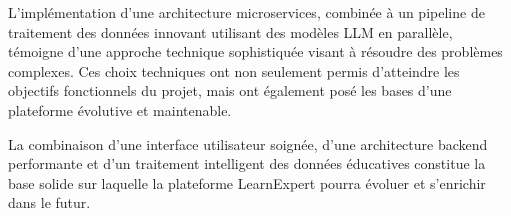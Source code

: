 L'implémentation d'une architecture microservices, combinée à un pipeline de traitement des données innovant utilisant des modèles LLM en parallèle, témoigne d'une approche technique sophistiquée visant à résoudre des problèmes complexes. Ces choix techniques ont non seulement permis d'atteindre les objectifs fonctionnels du projet, mais ont également posé les bases d'une plateforme évolutive et maintenable.

La combinaison d'une interface utilisateur soignée, d'une architecture backend performante et d'un traitement intelligent des données éducatives constitue la base solide sur laquelle la plateforme LearnExpert pourra évoluer et s'enrichir dans le futur.


